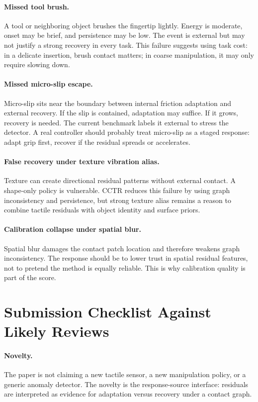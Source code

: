 \documentclass{article}
\newcommand{\method}{CCTR}
\begin{document}
\paragraph{Missed tool brush.}
A tool or neighboring object brushes the fingertip lightly. Energy is moderate, onset may be brief, and persistence may be low. The event is external but may not justify a strong recovery in every task. This failure suggests using task cost: in a delicate insertion, brush contact matters; in coarse manipulation, it may only require slowing down.

\paragraph{Missed micro-slip escape.}
Micro-slip sits near the boundary between internal friction adaptation and external recovery. If the slip is contained, adaptation may suffice. If it grows, recovery is needed. The current benchmark labels it external to stress the detector. A real controller should probably treat micro-slip as a staged response: adapt grip first, recover if the residual spreads or accelerates.

\paragraph{False recovery under texture vibration alias.}
Texture can create directional residual patterns without external contact. A shape-only policy is vulnerable. \method{} reduces this failure by using graph inconsistency and persistence, but strong texture alias remains a reason to combine tactile residuals with object identity and surface priors.

\paragraph{Calibration collapse under spatial blur.}
Spatial blur damages the contact patch location and therefore weakens graph inconsistency. The response should be to lower trust in spatial residual features, not to pretend the method is equally reliable. This is why calibration quality is part of the score.

\section{Submission Checklist Against Likely Reviews}

\paragraph{Novelty.}
The paper is not claiming a new tactile sensor, a new manipulation policy, or a generic anomaly detector. The novelty is the response-source interface: residuals are interpreted as evidence for adaptation versus recovery under a contact graph.
\end{document}
